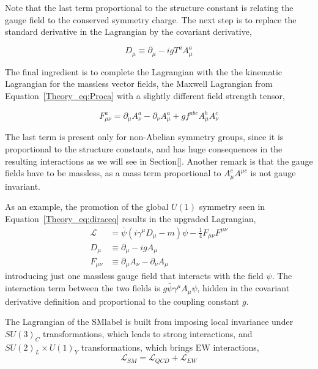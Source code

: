 Note that the last term proportional to the structure constant is relating the gauge field to the conserved symmetry charge. The next step is to replace the standard derivative in the Lagrangian by the covariant derivative,

\begin{equation}
    D_\mu\equiv\partial_\mu - igT^aA_\mu^a
\end{equation}

The final ingredient is to complete the Lagrangian with the the kinematic Lagrangian for the massless vector fields, the Maxwell Lagrangian from Equation~\ref{Theory_eq:Proca} with a slightly different field strength tensor,

\begin{equation}
    F_{\mu\nu}^a=\partial_\mu A_\nu^a - \partial_\nu A_\mu^a + gf^{abc}A_\mu^bA_\nu^c
\end{equation}

The last term is present only for non-Abelian symmetry groups, since it is proportional to the structure constants, and has huge consequences in the resulting interactions as we will see in Section[]. Another remark is that the gauge fields have to be massless, as a mass term proportional to $A_\mu^cA^{\mu c}$ is not gauge invariant.

As an example, the promotion of the global $U(1)$ symmetry seen in Equation~\ref{Theory_eq:diraceq} results in the upgraded Lagrangian,
\begin{equation}
\label{Theory_eq:diraceq20}
\begin{split}
    \mathcal{L}_{\ \ } &= \bar{\psi}(i\gamma^\mu D_\mu-m)\psi - \frac{1}{4}F_{\mu\nu}F^{\mu\nu} \\
    D_{\mu \ } &\equiv \partial_\mu -igA_\mu \\
    F_{\mu\nu} &\equiv \partial_\mu A_\nu - \partial_\nu A_\mu
\end{split}
\end{equation}
introducing just one massless gauge field that interacts with the field $\psi$. The interaction term between the two fields is $g\bar{\psi}\gamma^\mu A_\mu\psi$, hidden in the covariant derivative definition and proportional to the coupling constant $g$.

The Lagrangian of the \acrshort{SMlabel} is built from imposing local invariance under $SU(3)_C$ transformations, which leads to strong interactions, and $SU(2)_L\times U(1)_Y$ transformations, which brings EW interactions,
\begin{equation}
    \mathcal{L}_{SM} = \mathcal{L}_{QCD}+\mathcal{L}_{EW}
\end{equation}

